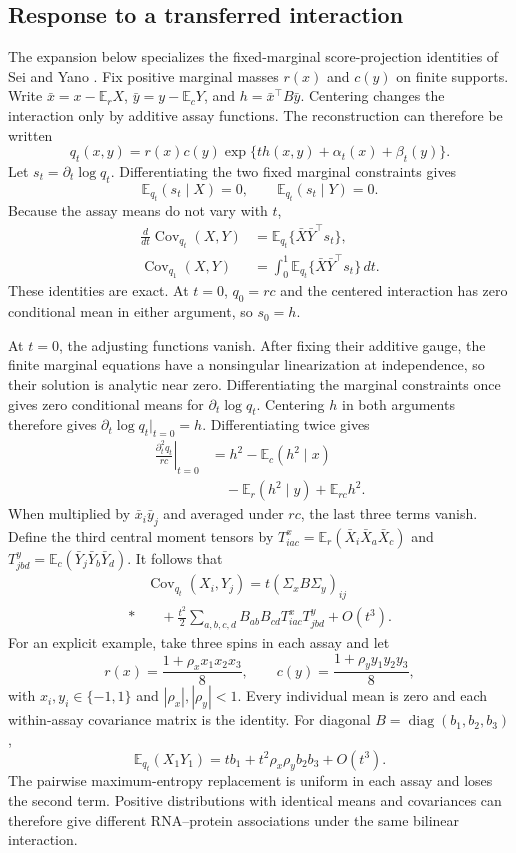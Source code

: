 \subsection{Response to a transferred interaction}\label{app:response}
The expansion below specializes the fixed-marginal score-projection identities of
Sei and Yano \cite{sei}. Fix positive marginal masses $r(x)$ and $c(y)$ on finite supports. Write
$\bar x=x-\mathbb E_r X$, $\bar y=y-\mathbb E_c Y$, and
$h=\bar x^\top B\bar y$. Centering changes the interaction only by additive
assay functions. The reconstruction can therefore be written
\[
 q_t(x,y)=r(x)c(y)\exp\{t h(x,y)+\alpha_t(x)+\beta_t(y)\}.
\]
Let $s_t=\partial_t\log q_t$. Differentiating the two fixed marginal
constraints gives
\[
 \mathbb E_{q_t}(s_t\mid X)=0,\qquad
 \mathbb E_{q_t}(s_t\mid Y)=0.
\]
Because the assay means do not vary with $t$,
\begin{align}
 \frac{d}{dt}\operatorname{Cov}_{q_t}(X,Y)
 &=\mathbb E_{q_t}\{\bar X\bar Y^\top s_t\},\label{eq:exact-response}\\
 \operatorname{Cov}_{q_1}(X,Y)
 &=\int_0^1\mathbb E_{q_t}\{\bar X\bar Y^\top s_t\}\,dt.
 \label{eq:exact-response-integral}
\end{align}
These identities are exact. At $t=0$, $q_0=rc$ and the centered interaction
has zero conditional mean in either argument, so $s_0=h$.

At $t=0$, the adjusting functions vanish. After fixing their additive gauge,
the finite marginal equations have a nonsingular linearization at independence,
so their solution is analytic near zero. Differentiating the marginal
constraints once gives zero conditional means for
$\partial_t\log q_t$. Centering $h$ in both arguments therefore gives
$\partial_t\log q_t|_{t=0}=h$. Differentiating twice gives
\begin{align*}
 \left.\frac{\partial_t^2q_t}{rc}\right|_{t=0}
 &=h^2-\mathbb E_c(h^2\mid x)\\
 &\quad-\mathbb E_r(h^2\mid y)+\mathbb E_{rc}h^2.
\end{align*}
When multiplied by $\bar x_i\bar y_j$ and averaged under $rc$, the last
three terms vanish. Define the third central moment tensors by
$T^x_{iac}=\mathbb E_r(\bar X_i\bar X_a\bar X_c)$ and
$T^y_{jbd}=\mathbb E_c(\bar Y_j\bar Y_b\bar Y_d)$. It follows that
\begin{align*}
 &\operatorname{Cov}_{q_t}(X_i,Y_j)=t(\Sigma_x B\Sigma_y)_{ij}\\*
 &\quad+\frac{t^2}{2}\sum_{a,b,c,d}
       B_{ab}B_{cd}T^x_{iac}T^y_{jbd}+O(t^3).
\end{align*}
For an explicit example, take three spins in each assay and let
\[
 r(x)=\frac{1+\rho_x x_1x_2x_3}{8},\qquad
 c(y)=\frac{1+\rho_y y_1y_2y_3}{8},
\]
with $x_i,y_i\in\{-1,1\}$ and $|\rho_x|,|\rho_y|<1$. Every individual mean
is zero and each within-assay covariance matrix is the identity. For diagonal
$B=\operatorname{diag}(b_1,b_2,b_3)$,
\[
 \mathbb E_{q_t}(X_1Y_1)
 =t b_1+t^2\rho_x\rho_y b_2b_3+O(t^3).
\]
The pairwise maximum-entropy replacement is uniform in each assay and loses
the second term. Positive distributions with identical means and covariances
can therefore give different RNA--protein associations under the same
bilinear interaction.


